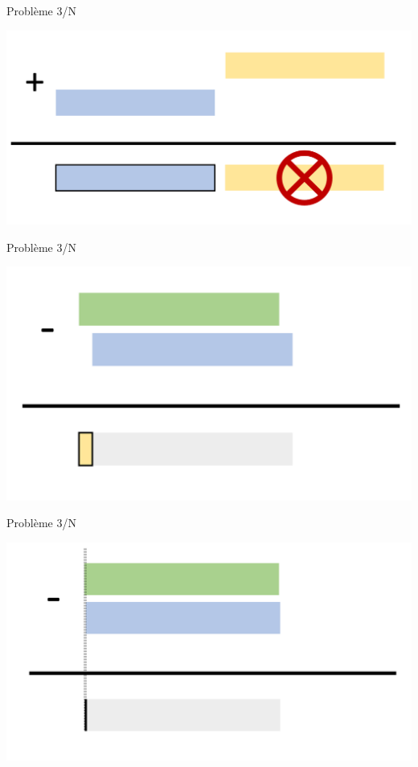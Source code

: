 \documentclass{beamer}
\begin{document}
    \begin{frame}{Problème 3/N} 
    \begin{center}
      \includegraphics[width=\textwidth]{addition_underflow}
      \end{center}
  \end{frame}

    \begin{frame}{Problème 3/N} 
    \begin{center}
      \includegraphics[width=\textwidth]{substraction}
      \end{center}
  \end{frame}

    \begin{frame}{Problème 3/N} 
    \begin{center}
      \includegraphics[width=\textwidth]{substraction_cancellation}
      \end{center}
  \end{frame}
\end{document}
